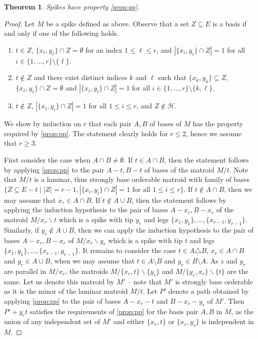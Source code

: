 \documentclass[11pt,a4paper]{article}
\theoremstyle{plain}
\newtheorem{thm}{Theorem}
\theoremstyle{definition}
\newcommand{\cH}{\mathcal{H}}
\begin{document}
\begin{thm} \label{thm:spike} Spikes have property \ref{prop:pp}.
\end{thm}
\begin{proof}
Let $M$ be a spike defined as above. Observe that a set $Z \subseteq E$ is a basis if and only if one of the following holds.
\begin{enumerate}\itemsep0em
\item $t \in Z$, $\{x_\ell, y_\ell\} \cap Z = \emptyset$ for an index $1 \le \ell \le r$, and $|\{x_i,y_i\} \cap Z| = 1$ for  all $i \in \{1,\dots, r\}\setminus\{\ell\}$.
\item $t \not \in Z$ and there exist distinct indices $k$ and $\ell$ such that $\{x_k,y_k\} \subseteq Z$, $\{x_\ell, y_\ell\} \cap Z = \emptyset$ and $|\{x_i,y_i\} \cap Z| = 1$ for all $i \in \{1,\dots, r\} \setminus \{k,\ell\}$.
\item $t \not \in Z$, $|\{x_i,y_i\} \cap Z| = 1$ for all $1 \le i \le r$, and $Z \not \in \cH$.
\end{enumerate}
We show by induction on $r$ that each pair $A, B$ of bases of $M$ has the property required by \ref{prop:pp}. The statement clearly holds for $r\leq 2$, hence we assume that $r\geq 3$.

First consider the case when $A \cap B \ne \emptyset$. If $t \in A \cap B$, then the statement follows by applying \ref{prop:pp} to the pair $A-t, B-t$ of bases of the matroid $M/t$. Note that $M/t$ is a laminar, thus strongly base orderable matroid with family of bases $\{Z\subseteq E-t \mid |Z| = r-1, |\{x_i,y_i\} \cap Z| = 1 \text{ for all $1 \le i \le r$}\}$. If $t \not \in A \cap B$, then we may assume that $x_r \in A \cap B$. If $t \not \in A \cup B$, then the statement follows by applying the induction hypothesis to the pair of bases $A-x_r, B-x_r$ of the matroid $M/x_r\backslash t$ which is a spike with tip $y_r$ and legs $\{x_1,y_1\}, \dots, \{x_{r-1}, y_{r-1}\}$. Similarly, if $y_r \not \in A \cup B$, then we can apply the induction hypothesis to the pair of bases $A-x_r, B-x_r$ of $M/x_r\backslash y_r$ which is a spike with tip $t$ and legs $\{x_1,y_1\}, \dots, \{x_{r-1}, y_{r-1}\}$. It remains to consider the case $t \in A \triangle B$, $x_r \in A\cap B$ and $y_r \in A \cup B$, when we may assume that $t \in A \setminus B$ and $y_r \in B \setminus A$. As $z$ and $y_r$ are parallel in $M/x_r$, the matroids $M/\{x_r,t\} \backslash \{y_r\}$ and $M/\{y_r,x_r\}\backslash\{t\}$ are the same. Let us denote this matroid by $M'$ -- note that $M'$ is strongly base orderable as it is the minor of the laminar matroid $M/t$. Let $P'$ denote a path obtained by applying \ref{prop:pp} to the pair of bases $A-x_r-t$ and $B-x_r-y_r$ of $M'$. Then $P'+y_rt$
satisfies the requirements of \ref{prop:pp} for the basis pair $A, B$ in $M$, as the union of any independent set of $M'$ and either $\{x_r,t\}$ or $\{x_r,y_r\}$ is independent in $M$.


\end{proof}
\end{document}
